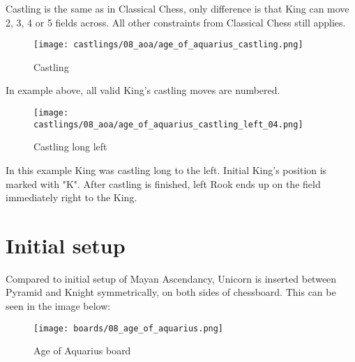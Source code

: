 Castling is the same as in Classical Chess, only difference is that King can move 2, 3, 4 or 5 fields across.
All other constraints from Classical Chess still applies.

\noindent
\begin{figure}[!h]
\texttt{[image: castlings/08\_aoa/age\_of\_aquarius\_castling.png]}
\caption{Castling}
\label{fig:age_of_aquarius_castling}
\end{figure}

In example above, all valid King's castling moves are numbered.

\noindent
\begin{figure}[!h]
\texttt{[image: castlings/08\_aoa/age\_of\_aquarius\_castling\_left\_04.png]}
\caption{Castling long left}
\label{fig:age_of_aquarius_castling_left_04}
\end{figure}

In this example King was castling long to the left. Initial King's position is marked with "K".
After castling is finished, left Rook ends up on the field immediately right to the King.

\clearpage %

\section*{Initial setup}

Compared to initial setup of Mayan Ascendancy, Unicorn is inserted between Pyramid and Knight
symmetrically, on both sides of chessboard. This can be seen in the image below:

\noindent
\begin{figure}[h]
\texttt{[image: boards/08\_age\_of\_aquarius.png]}
\caption{Age of Aquarius board}
\label{fig:08_age_of_aquarius}
\end{figure}

\clearpage %
